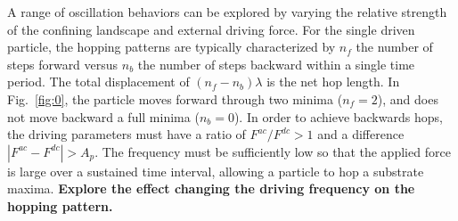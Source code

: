 \documentclass[twocolumn,preprintnumbers,amsmath,amssymb,aps,prx]{revtex4}
\begin{document}
  A range of oscillation behaviors
  can be explored by varying the
  relative strength of the confining landscape
  and external driving force.
  For the single driven particle,
  the hopping patterns are typically characterized
  by $n_f$ the number of steps forward
  versus $n_b$ the number of steps backward within a single
  time period.
  The total displacement of $(n_f - n_b) \lambda$ %
  is the net hop length.  
  In Fig.~\ref{fig:0},
  the particle moves forward through two minima ($n_f = 2$),
  and does not move backward a full minima ($n_b = 0$).  
  In order to achieve
  backwards hops,
  the driving parameters must have
  a ratio of $F^{ac}/F^{dc} > 1$ 
  and a difference $|F^{ac} - F^{dc}| > A_p$.
  The frequency must be sufficiently low so that 
  the applied force is large
  over a sustained time interval,
  allowing a particle to hop a substrate maxima.
  {\bf Explore the effect changing the driving frequency on the hopping pattern.}
\end{document}
